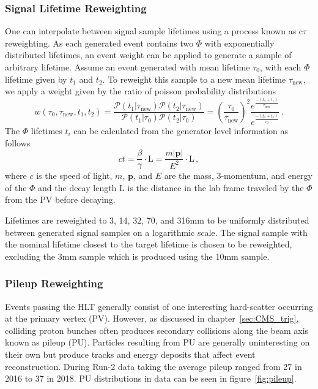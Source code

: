 \subsubsection{Signal Lifetime Reweighting} \label{sec:ana_ctau}
One can interpolate between signal sample lifetimes using a process known as c$\tau$ reweighting. As each generated event contains two $\Phi$ with exponentially distributed lifetimes, an event weight can be applied to generate a sample of arbitrary lifetime. Assume an event generated with mean lifetime $\tau_0$, with each $\Phi$ lifetime given by $t_1$ and $t_2$. To reweight this sample to a new mean lifetime $\tau_\mathrm{new}$, we apply a weight given by the ratio of poisson probability distributions
\begin{equation}\label{eq:ctreweight}
	w(\tau_0, \tau_{\mathrm{new}}, t_1, t_2) =\frac{\mathcal{P}(t_1|\tau_\mathrm{new})\mathcal{P}(t_2|\tau_\mathrm{new})}{\mathcal{P}(t_1|\tau_0)\mathcal{P}(t_2|\tau_0)}= \left(\frac{\tau_0}{\tau_{\mathrm{new}}}\right)^2 \frac{e^{\frac{-(t_2+t_1)}{\tau_{\mathrm{new}}}}}{e^{\frac{-(t_2+t_1)}{\tau_0}}}\,.
\end{equation}
The $\Phi$ lifetimes $t_i$ can be calculated from the generator level information as follows
\begin{equation} \label{eq:lifetime}
	ct=\frac{\beta}{\gamma}\cdot\mathrm{L}=\frac{m|\mathbf{p}|}{E^2}\cdot\mathrm{L}\,,
\end{equation}
where $c$ is the speed of light, $m$, $\mathbf{p}$, and $E$ are the mass, 3-momentum, and energy of the $\Phi$ and the decay length $\mathrm{L}$ is the distance in the lab frame traveled by the $\Phi$ from the PV before decaying. 

Lifetimes are reweighted to 3, 14, 32, 70, and 316\unit{mm} to be uniformly distributed between generated signal samples on a logarithmic scale. The signal sample with the nominal lifetime closest to the target lifetime is chosen to be reweighted, excluding the 3\unit{mm} sample which is produced using the 10\unit{mm} sample.

\subsubsection{Pileup Reweighting} \label{sec:ana_pu}
Events passing the HLT generally consist of one interesting hard-scatter occurring at the primary vertex (PV). However, as discussed in chapter~\ref{sec:CMS_trig}, colliding proton bunches often produces secondary collisions along the beam axis known as pileup (PU). Particles resulting from PU are generally uninteresting on their own but produce tracks and energy deposits that affect event reconstruction. During Run-2 data taking the average pileup ranged from 27 in 2016 to 37 in 2018. PU distributions in data can be seen in figure~\ref{fig:pileup}.

